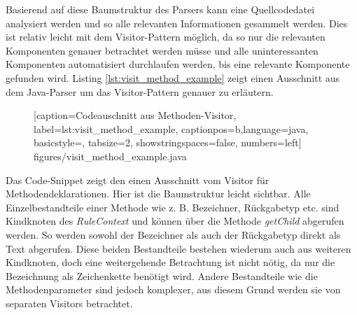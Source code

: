 Basierend auf diese Baumstruktur des Parsers kann eine Quellcodedatei analysiert werden und so alle relevanten Informationen gesammelt werden. 
Dies ist relativ leicht mit dem Visitor-Pattern möglich, da so nur die relevanten  Komponenten genauer betrachtet werden müsse und alle uninteressanten Komponenten automatisiert durchlaufen werden, bis eine relevante Komponente gefunden wird. Listing \ref{lst:visit_method_example} zeigt einen Ausschnitt aus dem Java-Parser um das Visitor-Pattern genauer zu erläutern.

		\begin{figure} [htbp]
			
			[caption={Codeauschnitt aus  Methoden-Visitor},
			label={lst:visit_method_example},
			captionpos=b,language=java, basicstyle=\footnotesize, tabsize=2, showstringspaces=false,  numbers=left]
			{figures/visit_method_example.java}
		\end{figure}
Das Code-Snippet zeigt den einen Ausschnitt vom Visitor für Methodendeklarationen. Hier ist die Baumstruktur leicht sichtbar. Alle Einzelbestandteile einer Methode wie z. B. Bezeichner, Rückgabetyp etc. sind Kindknoten des \textit{RuleContext} und können über die Methode \textit{getChild} abgerufen werden. So werden sowohl der Bezeichner als auch der Rückgabetyp direkt als Text abgerufen. Diese  beiden Bestandteile bestehen wiederum auch aus weiteren Kindknoten, doch eine weitergehende Betrachtung ist nicht nötig, da nur die Bezeichnung als Zeichenkette benötigt wird. Andere Bestandteile wie die Methodenparameter sind jedoch komplexer, aus diesem Grund werden sie von separaten Visitors betrachtet.


